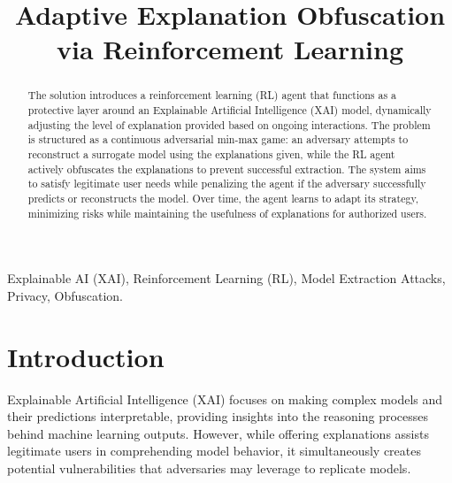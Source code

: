 \documentclass[conference]{IEEEtran}
\begin{document}
\title{Adaptive Explanation Obfuscation via Reinforcement Learning}

\author{
\and
{}
\and
{}
\and
{}
}

\maketitle

\begin{abstract}
The solution introduces a reinforcement learning (RL) agent that functions as a protective layer around an Explainable Artificial Intelligence (XAI) model, dynamically adjusting the level of explanation provided based on ongoing interactions. The problem is structured as a continuous adversarial min-max game: an adversary attempts to reconstruct a surrogate model using the explanations given, while the RL agent actively obfuscates the explanations to prevent successful extraction. The system aims to satisfy legitimate user needs while penalizing the agent if the adversary successfully predicts or reconstructs the model. Over time, the agent learns to adapt its strategy, minimizing risks while maintaining the usefulness of explanations for authorized users.
\end{abstract}

\begin{IEEEkeywords}
Explainable AI (XAI), Reinforcement Learning (RL), Model Extraction Attacks, Privacy, Obfuscation.
\end{IEEEkeywords}

\section{Introduction}
Explainable Artificial Intelligence (XAI) focuses on making complex models and their predictions interpretable, providing insights into the reasoning processes behind machine learning outputs. However, while offering explanations assists legitimate users in comprehending model behavior, it simultaneously creates potential vulnerabilities that adversaries may leverage to replicate models. 
\end{document}
